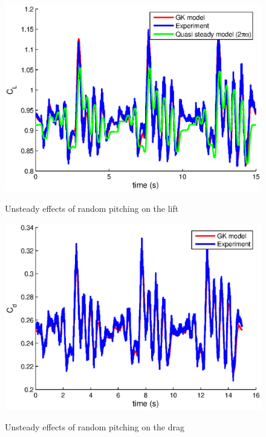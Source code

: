\begin{figure}[h]
  \begin{center}
    \scalebox{1.0}  
  {\includegraphics{./Figures/Cl_u=3_meanaoa=12(15seconds)_amp=2_freq=2p0.eps}}
  \end{center}
  \caption{Unsteady effects of random pitching on the lift}
  \label{fig:Pitching_random_Cl_12}
\end{figure}

\begin{figure}[h]
  \begin{center}
    \scalebox{1.0}  
  {\includegraphics{./Figures/Cd_u=3_meanaoa=12(15seconds)_amp=2_freq=2p0.eps}}
  \end{center}
  \caption{Unsteady effects of random pitching on the drag}
  \label{fig:Pitching_random_Cd_12}
\end{figure}

